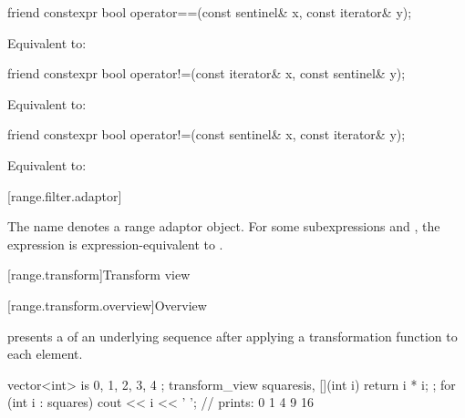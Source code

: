 %
\begin{itemdecl}
friend constexpr bool operator==(const sentinel& x, const iterator& y);
\end{itemdecl}

\begin{itemdescr}
\pnum
\effects Equivalent to: 
\end{itemdescr}

%
\begin{itemdecl}
friend constexpr bool operator!=(const iterator& x, const sentinel& y);
\end{itemdecl}

\begin{itemdescr}
\pnum
\effects Equivalent to: 
\end{itemdescr}

%
\begin{itemdecl}
friend constexpr bool operator!=(const sentinel& x, const iterator& y);
\end{itemdecl}

\begin{itemdescr}
\pnum
\effects Equivalent to: 
\end{itemdescr}

[range.filter.adaptor]{}

\pnum
The name  denotes a
range adaptor object.
For some subexpressions  and ,
the expression  is expression-equivalent to
.


[range.transform]{Transform view}

[range.transform.overview]{Overview}

\pnum
{} presents
a  of an underlying sequence after
applying a transformation function to each element.

\pnum
\begin{example}
\begin{codeblock}
vector<int> is{ 0, 1, 2, 3, 4 };
transform_view squares{is, [](int i) { return i * i; }};
for (int i : squares)
  cout << i << ' '; // prints: 0 1 4 9 16
\end{codeblock}
\end{example}

